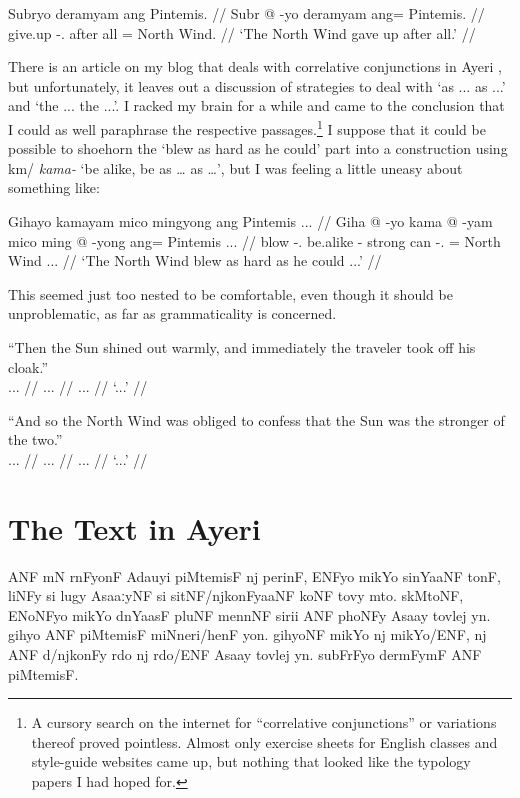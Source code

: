 \documentclass[12pt,paper=a4]{scrartcl}
\newcommand{\xayr}[3]{{\Tagati #1} \emph{#2} \enquote*{#3}}
\newenvironment{ayeri}{
    \doublespacing
    \begin{multicols}{2}
    \Tagati
}{
    \end{multicols} \par
}
\begin{document}
\a \begingl
	\glpreamble Subryo deramyam ang Pintemis. //
	\gla Subr @ -yo deramyam ang= Pintemis. //
	\glb give.up -\Tsg{}.\N{} {after all} \Aarg{}= {North Wind}. //
	\glft `The North Wind gave up after all.' //
\endgl
\xe

There is an article on my blog that deals with correlative conjunctions in Ayeri \autocite{becker2012}, but unfortunately, it leaves out a discussion of strategies to deal with `as ... as ...' and `the ... the ...'. I racked my brain for a while and came to the conclusion that I could as well paraphrase the respective passages.\footnote{A cursory search on the internet for \enquote{correlative conjunctions} or variations thereof proved pointless. Almost only exercise sheets for English classes and style-guide websites came up, but nothing that looked like the typology papers I had hoped for.} I suppose that it could be possible to shoehorn the `blew as hard as he could' part into a construction using \xayr{km/}{kama-}{be alike, be as … as …}, but I was feeling a little uneasy about something like:

\ex[exno=iii]
\begingl
	\glpreamble Gihayo kamayam mico mingyong ang Pintemis ... //
	\gla Giha @ -yo kama @ -yam mico ming @ -yong ang= Pintemis ... //
	\glb blow -\Tsg{}.\N{} be.alike -\Ptcp{} strong can -\Tsg{}.\N{} \Aarg{}= {North Wind} ... //
	\glft `The North Wind blew as hard as he could ...' //
\endgl
\xe

This seemed just too nested to be comfortable, even though it should be unproblematic, as far as grammaticality is concerned.

\ex %
\begingl
	\glpreamble \enquote{Then the Sun shined out warmly, and immediately the traveler took off his cloak.}\\
		... //
	\gla ... //
	\glb ... //
	\glft `...' //
\endgl
\xe

\ex %
\begingl
	\glpreamble \enquote{And so the North Wind was obliged to confess that the Sun was the stronger of the two.}\\
		... //
	\gla ... //
	\glb ... //
	\glft `...' //
\endgl
\xe

\section{The Text in Ayeri}

\begin{ayeri}
\noindent ANF mN rnFyonF Adauyi piMtemisF nj perinF, ENFyo mikYo sinYaaNF tonF, liNFy si lugy AsaaːyNF si sitNF/njkonFyaaNF koNF tovy mto.
skMtoNF, ENoNFyo mikYo dnYaasF pluNF mennNF sirii ANF phoNFy Asaay tovlej yn.
gihyo ANF piM\-temisF miNneri/henF yon.
gihyoNF mikYo nj mikYo/ENF, nj ANF d/njkonFy rdo nj rdo/ENF Asaay tovlej yn.
subFrFyo dermFymF ANF piMtemisF.
\end{ayeri}
\end{document}
